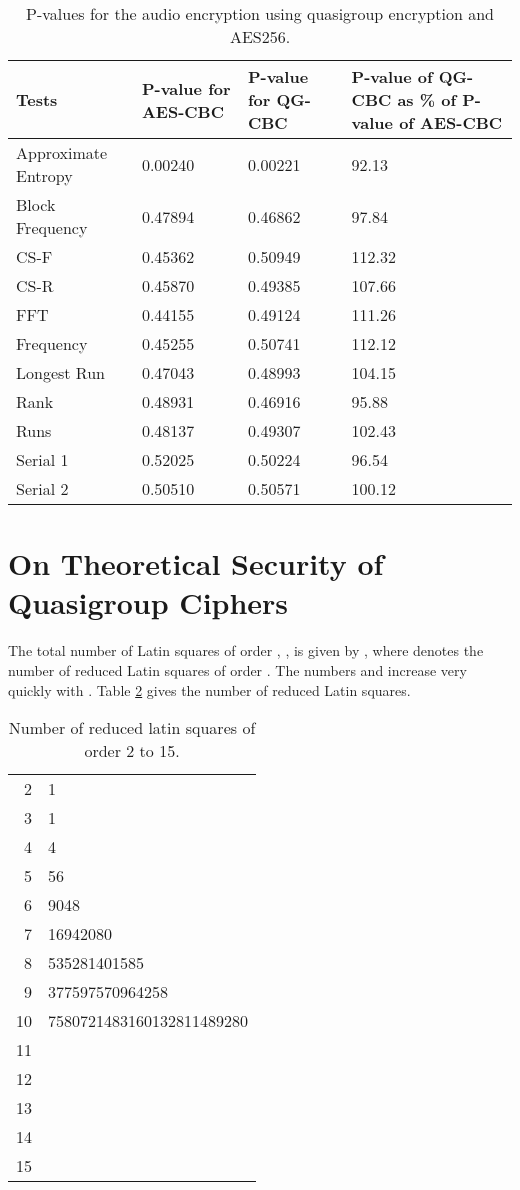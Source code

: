 \documentclass[conference]{IEEEtran}
\begin{document}
\begin{table}
\centering
\begin{tabular}{|p{2cm}|p{1.5cm}|p{1.5cm}|p{2cm}|}
\hline
Tests& P-value for AES-CBC&  P-value for QG-CBC& P-value of QG-CBC as \% of P-value of AES-CBC\\ \hline
Approximate Entropy& 0.00240& 0.00221& 92.13\\ \hline
Block Frequency& 0.47894&  0.46862& 97.84\\ \hline
CS-F& 0.45362&  0.50949& 112.32\\ \hline
CS-R& 0.45870&  0.49385& 107.66\\ \hline
FFT& 0.44155& 0.49124& 111.26\\ \hline
Frequency& 0.45255&  0.50741&  112.12\\ \hline
Longest Run& 0.47043&  0.48993&  104.15\\ \hline
Rank& 0.48931& 0.46916& 95.88\\ \hline
Runs& 0.48137& 0.49307& 102.43\\ \hline
Serial 1& 0.52025& 0.50224& 96.54\\ \hline
Serial 2& 0.50510& 0.50571& 100.12\\ \hline
\end{tabular}
\caption{P-values for the audio encryption using quasigroup encryption and AES256.}
\label{audio_tests}
\end{table}

\section{On Theoretical Security of Quasigroup Ciphers}
The total number of Latin squares of order , , is given by , where  denotes the number of reduced Latin squares of order . The numbers  and  increase very quickly with  \cite{Satti}. Table \ref{latinSquaresTn} gives the number of reduced Latin squares.

\begin{table}
\centering
\begin{tabular}{|r|l|}
\hline
& \\ \hline
2& 1 \\\hline
3& 1 \\\hline
4& 4 \\\hline
5& 56 \\\hline
6& 9048 \\\hline
7& 16942080 \\\hline
8& 535281401585 \\\hline
9& 377597570964258 \\\hline
10& 7580721483160132811489280 \\\hline
11& \\\hline
12& \\\hline
13& \\\hline
14& \\\hline
15& \\\hline
\end{tabular}
\caption{Number of reduced latin squares of order 2 to 15.}
\vspace{-0.28in}
\label{latinSquaresTn}
\end{table}
\end{document}
